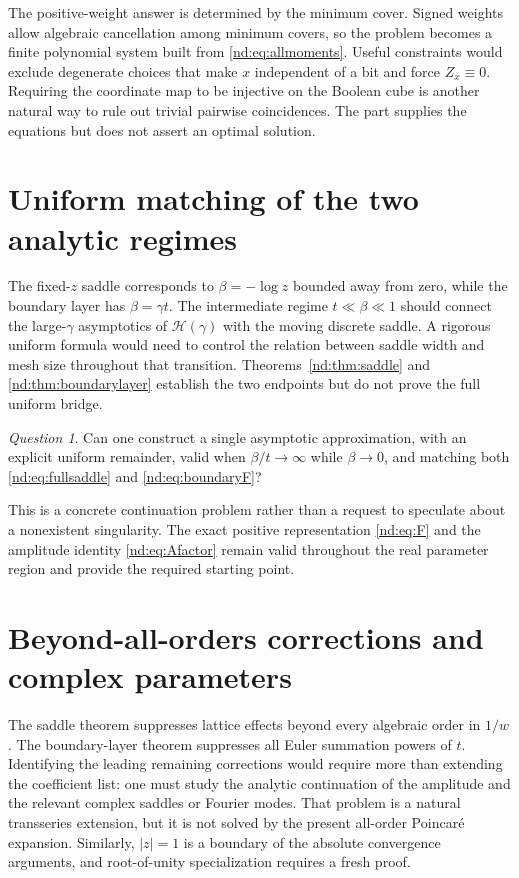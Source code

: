 \documentclass[11pt,a4paper,oneside,openany]{book}
\numberwithin{equation}{chapter}
\theoremstyle{definition}
\theoremstyle{remark}
\newtheorem{question}[theorem]{Question}
\begin{document}
The positive-weight answer is determined by the minimum cover. Signed weights
allow algebraic cancellation among minimum covers, so the problem becomes a
finite polynomial system built from \eqref{nd:eq:allmoments}. Useful constraints
would exclude degenerate choices that make \(x\) independent of a bit and
force \(Z_x\equiv0\). Requiring the coordinate map to be injective on the
Boolean cube is another natural way to rule out trivial pairwise coincidences.
The part supplies the equations but does not assert an optimal solution.

\section{Uniform matching of the two analytic regimes}
The fixed-\(z\) saddle corresponds to \(\beta=-\log z\) bounded away from zero,
while the boundary layer has \(\beta=\gamma t\). The intermediate regime
\(t\ll\beta\ll1\) should connect the large-\(\gamma\) asymptotics of
\(\mathcal H(\gamma)\) with the moving discrete saddle. A rigorous uniform
formula would need to control the relation between saddle width and mesh
size throughout that transition. Theorems~\ref{nd:thm:saddle} and
\ref{nd:thm:boundarylayer} establish the two endpoints but do not prove the full
uniform bridge.

\begin{question}
Can one construct a single asymptotic approximation, with an explicit
uniform remainder, valid when \(\beta/t\to\infty\) while \(\beta\to0\),
and matching both \eqref{nd:eq:fullsaddle} and \eqref{nd:eq:boundaryF}?
\end{question}

This is a concrete continuation problem rather than a request to speculate
about a nonexistent singularity. The exact positive representation
\eqref{nd:eq:F} and the amplitude identity \eqref{nd:eq:Afactor} remain valid
throughout the real parameter region and provide the required starting point.

\section{Beyond-all-orders corrections and complex parameters}
The saddle theorem suppresses lattice effects beyond every algebraic order
in \(1/w\). The boundary-layer theorem suppresses all Euler summation powers
of \(t\). Identifying the leading remaining corrections would require more
than extending the coefficient list: one must study the analytic continuation
of the amplitude and the relevant complex saddles or Fourier modes.
That problem is a natural transseries extension, but it is not solved by the
present all-order Poincar\'e expansion. Similarly, \(|z|=1\) is a boundary of
the absolute convergence arguments, and root-of-unity specialization requires
a fresh proof.
\end{document}
